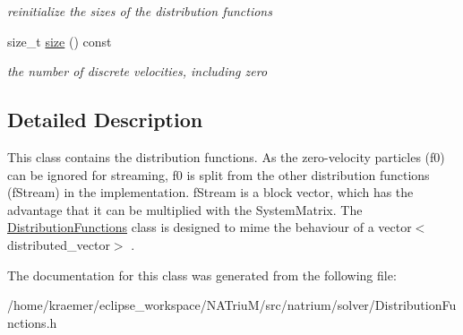 \begin{DoxyCompactItemize}
\begin{DoxyCompactList}\small\item\em reinitialize the sizes of the distribution functions \end{DoxyCompactList}\item 
\hypertarget{classnatrium_1_1DistributionFunctions_a636814c639143c76989b09b2a92b6757}{size\-\_\-t \hyperlink{classnatrium_1_1DistributionFunctions_a636814c639143c76989b09b2a92b6757}{size} () const }\label{classnatrium_1_1DistributionFunctions_a636814c639143c76989b09b2a92b6757}

\begin{DoxyCompactList}\small\item\em the number of discrete velocities, including zero \end{DoxyCompactList}\end{DoxyCompactItemize}


\subsection{Detailed Description}
This class contains the distribution functions. As the zero-\/velocity particles (f0) can be ignored for streaming, f0 is split from the other distribution functions (f\-Stream) in the implementation. f\-Stream is a block vector, which has the advantage that it can be multiplied with the System\-Matrix. The \hyperlink{classnatrium_1_1DistributionFunctions}{Distribution\-Functions} class is designed to mime the behaviour of a vector$<$distributed\-\_\-vector$>$ . 

The documentation for this class was generated from the following file\-:\begin{DoxyCompactItemize}
\item 
/home/kraemer/eclipse\-\_\-workspace/\-N\-A\-Triu\-M/src/natrium/solver/Distribution\-Functions.\-h\end{DoxyCompactItemize}

